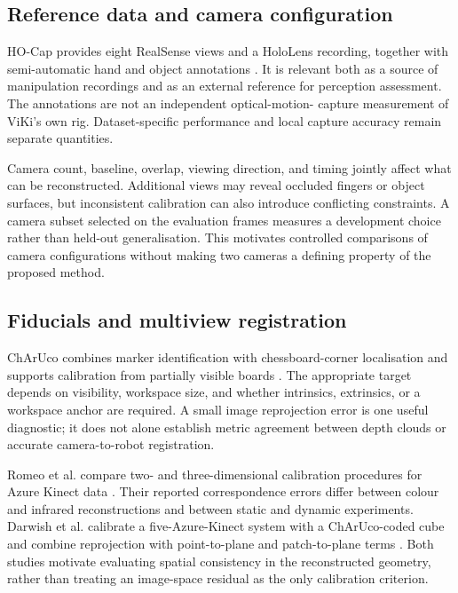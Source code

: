 \subsection{Reference data and camera configuration}

HO-Cap provides eight RealSense views and a HoloLens recording, together with
semi-automatic hand and object annotations \cite{hocap}. It is relevant both
as a source of manipulation recordings and as an external reference for
perception assessment. The annotations are not an independent optical-motion-
capture measurement of ViKi's own rig. Dataset-specific performance and local
capture accuracy remain separate quantities.

Camera count, baseline, overlap, viewing direction, and timing jointly affect
what can be reconstructed. Additional views may reveal occluded fingers or
object surfaces, but inconsistent calibration can also introduce conflicting
constraints. A camera subset selected on the evaluation frames measures a
development choice rather than held-out generalisation. This motivates
controlled comparisons of camera configurations without making two cameras
a defining property of the proposed method.

\subsection{Fiducials and multiview registration}

ChArUco combines marker identification with chessboard-corner localisation and
supports calibration from partially visible boards \cite{opencvcharuco}.
The appropriate target depends on visibility, workspace size, and whether
intrinsics, extrinsics, or a workspace anchor are required. A small image
reprojection error is one useful diagnostic; it does not alone establish
metric agreement between depth clouds or accurate camera-to-robot registration.

Romeo et al. compare two- and three-dimensional calibration procedures for
Azure Kinect data \cite{romeo}. Their reported correspondence errors differ
between colour and infrared reconstructions and between static and dynamic
experiments. Darwish et al. calibrate a five-Azure-Kinect system with a
ChArUco-coded cube and combine reprojection with point-to-plane and
patch-to-plane terms \cite{darwish}. Both studies motivate evaluating spatial
consistency in the reconstructed geometry, rather than treating an image-space
residual as the only calibration criterion.

